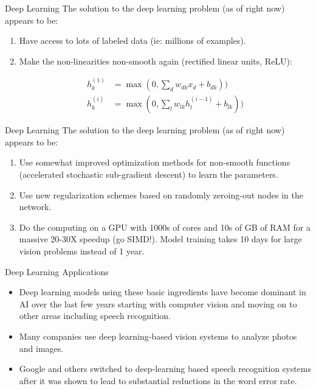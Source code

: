 \documentclass[serif,xcolor=pdftex,dvipsnames,table,hyperref={bookmarks=false}]{beamer}
\begin{document}
\begin{frame}[t]{Deep Learning}
The solution to the deep learning problem (as of right now) appears to be:

\begin{enumerate}
\setlength{\itemsep}{8pt}

\item Have access to lots of labeled data (ie: millions of examples).

\pause\item Make the non-linearities non-smooth again (rectified linear units, ReLU):

\begin{align}
h^{(1)}_k &= \max(0,\sum_{d}w_{dk}x_d + b_{dk}))\\
h^{(i)}_k &= \max(0,\sum_{l}w_{lk}h^{(i-1)}_l + b_{lk}))
\end{align}

\end{enumerate}
\end{frame}

\begin{frame}[t]{Deep Learning}
The solution to the deep learning problem (as of right now) appears to be:

\begin{enumerate}
\setlength{\itemsep}{8pt}
\setcounter{enumi}{2}
\item Use somewhat improved optimization methods for non-smooth functions (accelerated stochastic sub-gradient descent) to learn the parameters.

\pause\item Use new regularization schemes based on randomly zeroing-out nodes in the
network.

\pause\item Do the computing on a GPU with 1000s of cores and 10s of GB of RAM for a massive 20-30X speedup (go SIMD!). Model training takes 10 days for large vision problems instead of 1 year.

\end{enumerate}
\end{frame}

\begin{frame}[t]{Deep Learning Applications}

\begin{itemize}
\setlength{\itemsep}{8pt}

\item Deep learning models using these basic ingredients have become dominant in AI over the last few years starting with computer vision and moving on to other areas including speech recognition.

\pause\item Many companies use deep learning-based vision systems to analyze photos and images.

\pause\item Google and others switched to deep-learning based speech recognition systems after it was shown to lead to substantial reductions in the word error rate.
\end{itemize}
\end{frame}
\end{document}
